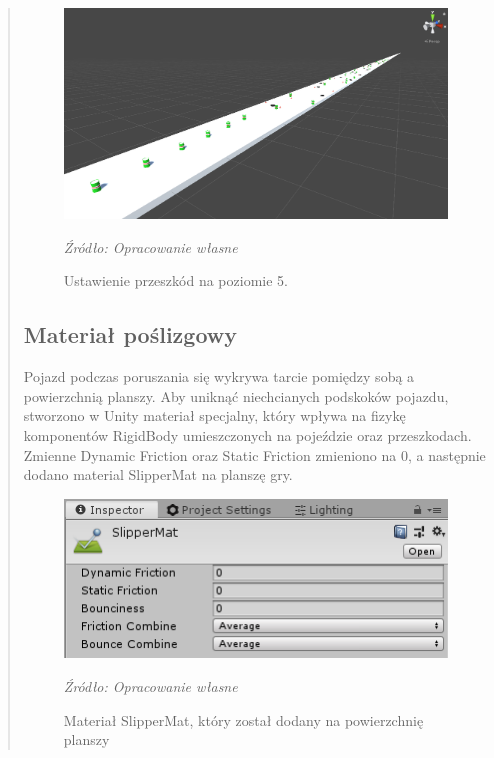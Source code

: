 \begin{quotation}
\begin{figure}[!hbt]
\centering
  \includegraphics[width=1\linewidth]{scena5.png}
  \caption{Ustawienie przeszkód na poziomie 5.}\label{rys_18}
  \begin{minipage}[t]{0.75\linewidth}
    \emph{Źródło: Opracowanie własne}
  \end{minipage}
\end{figure}

\newpage
\subsection{Materiał poślizgowy}
\indent Pojazd podczas poruszania się wykrywa tarcie pomiędzy sobą a powierzchnią planszy. Aby uniknąć niechcianych podskoków pojazdu, stworzono w Unity materiał specjalny, który wpływa na fizykę komponentów RigidBody umieszczonych na pojeździe oraz przeszkodach. Zmienne Dynamic Friction oraz Static Friction zmieniono na 0, a następnie dodano material SlipperMat na planszę gry.


\begin{figure}[!hbt]
\centering
  \includegraphics[width=1\linewidth]{slippermat.png}
  \caption{Materiał SlipperMat, który został dodany na powierzchnię planszy}\label{rys_19}
  \begin{minipage}[t]{0.75\linewidth}
    \emph{Źródło: Opracowanie własne}
  \end{minipage}
\end{figure}
\newpage

\end{quotation}
